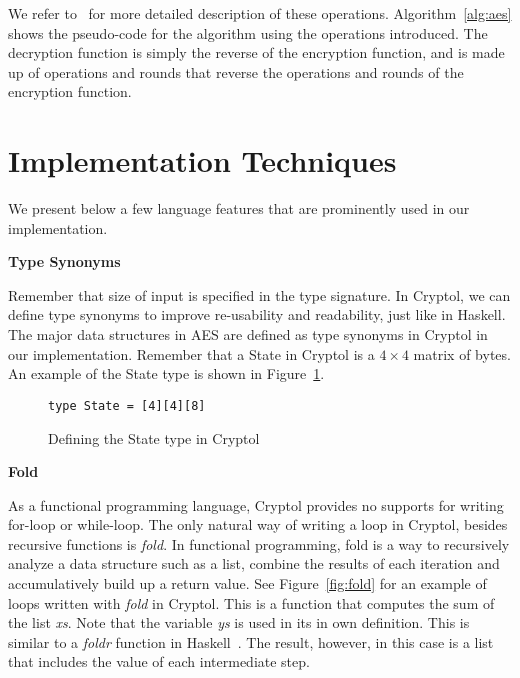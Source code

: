 \documentclass[a4paper, notitlepage]{report}
\renewcommand{\paragraph}[1]{\vspace*{1em}\noindent\textbf{#1}\hspace*{1em}}
\begin{document}
We refer to~\cite{standard2001announcing} for more detailed description of these
operations. Algorithm~\ref{alg:aes} shows the pseudo-code for the algorithm using
the operations
introduced.
The decryption function is simply the reverse of the encryption function, and
is made up of operations and rounds that reverse the operations and rounds of
the encryption function.


\section{Implementation Techniques}


We present below a few language features that are prominently used in our
implementation.

\paragraph{Type Synonyms}

Remember that size of input is specified in the type signature.
In Cryptol, we can define type synonyms to improve re-usability and readability,
just like in Haskell.
The major data structures in AES are defined as type synonyms in Cryptol in our
implementation.
Remember that a State in Cryptol is a $4 \times 4$ matrix of bytes. An example
of the State type is shown in Figure~\ref{fig:typedef}. 

\begin{figure}
  \begin{lstlisting}[frame=single]
    type State = [4][4][8]
  \end{lstlisting}
  \caption{Defining the State type in Cryptol}
  \label{fig:typedef}
\end{figure}


\paragraph{Fold}

As a functional programming language, Cryptol provides no supports for writing
for-loop or
while-loop. The only natural way of writing a loop in Cryptol, besides recursive
functions is \emph{fold}.
In functional programming, fold is a way to recursively analyze a data structure
such as a list, combine the results of each iteration and accumulatively build up
a return value.
See Figure~\ref{fig:fold} for an example of loops written with \emph{fold} in
Cryptol.
This is a function that computes the sum of the list \emph{xs}.
Note that the variable \emph{ys} is used in its in own definition.
This is similar to a \emph{foldr} function in Haskell~\cite{lipovaca2011learn}.
The result, however, in this case is a list that includes the value of each
intermediate step.
\end{document}

